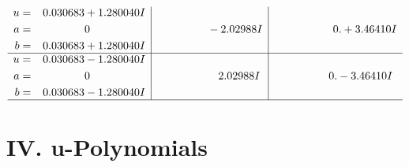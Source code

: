\documentclass[1p]{elsarticle_modified}
\theoremstyle{definition}
\begin{document}
$$\begin{array}{c|c|c}
\begin{aligned}
u &= \phantom{-}0.030683 + 1.280040 I \\
a &= \phantom{-0.000000 } 0 \\
b &= \phantom{-}0.030683 + 1.280040 I\end{aligned}
 & \phantom{-0.000000 } -2.02988 I & \phantom{-0.000000 -}0. + 3.46410 I \\ \hline\begin{aligned}
u &= \phantom{-}0.030683 - 1.280040 I \\
a &= \phantom{-0.000000 } 0 \\
b &= \phantom{-}0.030683 - 1.280040 I\end{aligned}
 & \phantom{-0.000000 -}2.02988 I & \phantom{-0.000000 } 0. - 3.46410 I\\
 \hline 
 \end{array}$$\newpage
\newpage\renewcommand{\arraystretch}{1}
\centering \section*{ IV. u-Polynomials}
\end{document}
